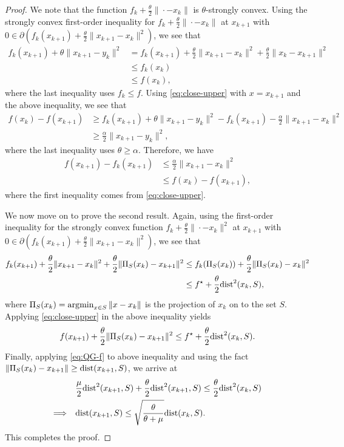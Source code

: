 \documentclass[11pt]{article}
\begin{document}
\begin{proof}
    We note that the function $f_k + \frac{\theta}{2}\|\cdot-x_k\|$ is $\theta$-strongly convex. Using the strongly convex first-order inequality for $f_k + \frac{\theta}{2}\|\cdot-x_k\|$ at $x_{k+1}$ with $0 \in \partial (f_k(x_{k+1}) + \frac{\theta}{2}\|x_{k+1}-x_k\|^2) $, we see that 
\begin{align*}
     f_{k}(x_{k+1}) + \theta \|x_{k+1} - y_k\|^2& = f_{k}(x_{k+1}) + \frac{\theta}{2} \|x_{k+1} - x_k\|^2 + \frac{\theta}{2} \|x_k - x_{k+1}\|^2 \\
     & \leq f_k(x_k) \\
     & \leq f(x_k),
\end{align*}
where the last inequality uses $f_{k} \leq f$. Using \eqref{eq:close-upper} with $x = x_{k+1}$ and the above inequality, we see that 
\begin{align*}
    f(x_k) - f(x_{k+1})  &\geq f_{k}(x_{k+1}) + \theta \|x_{k+1} - y_k\|^2 - f_k(x_{k+1})  - \frac{\alpha}{2}\|x_{k+1} - x_k\|^2 \\
    & \geq \frac{\alpha}{2} \|x_{k+1} - y_k\|^2,
\end{align*}
where the last inequality uses $\theta \geq \alpha$. Therefore, we have 
\begin{align*}
    f(x_{k+1}) - f_k(x_{k+1}) & \leq \frac{\alpha}{2}\|x_{k+1} - x_k\|^2 \\
    & \leq f(x_k) - f(x_{k+1}),
\end{align*}
where the first inequality comes from \eqref{eq:close-upper}.

We now move on to prove the second result. Again, using the first-order inequality for the strongly convex function $f_k + \frac{\theta}{2} \|\cdot - x_k\|^2$ at $x_{k+1}$ with $0 \in \partial ( f_k(x_{k+1}) + \frac{\theta}{2} \|x_{k+1} - x_k\|^2)$, we see that 
\begin{align*}
    f_{k}(x_{k+1}) + \frac{\theta}{2} \|x_{k+1} - x_k\|^2 + \frac{\theta}{2} \|\Pi_{S}(x_k)  - x_{k+1}\|^2 & \leq f_k(\Pi_{S}(x_k)) + \frac{\theta}{2}\|\Pi_{S}(x_k) - x_k\|^2 \\
    &\leq f^\star + \frac{\theta}{2}\mathrm{dist}^2(x_k,S),
\end{align*}
where $\Pi_{S}(x_k) = \operatorname*{\arg\!\min}_{x \in S} \|x-x_k\|$ is the projection of $x_k$ on to the set $S$.
Applying \eqref{eq:close-upper} in the above inequality yields 
\begin{equation*}
    f(x_{k+1})+ \frac{\theta}{2} \|\Pi_{S}(x_k)  - x_{k+1}\|^2 \leq  f^\star + \frac{\theta}{2}\mathrm{dist}^2(x_k,S).
\end{equation*}
Finally, applying \eqref{eq:QG-f} to above inequality and using the fact $\|\Pi_{S}(x_k)  - x_{k+1}\|  \geq \mathrm{dist}(x_{k+1},S)$, we arrive at 
\begin{align*}
    & \frac{\mu}{2}\mathrm{dist}^2(x_{k+1},S)  + \frac{\theta}{2}\mathrm{dist}^2(x_{k+1},S)  \leq \frac{\theta}{2}\mathrm{dist}^2(x_k,S) \\
   \Longrightarrow \quad & \mathrm{dist}(x_{k+1},S) \leq \sqrt{\frac{\theta}{\theta +\mu}}\mathrm{dist}(x_k,S).
\end{align*}
This completes the proof. 
\end{proof}
\end{document}
